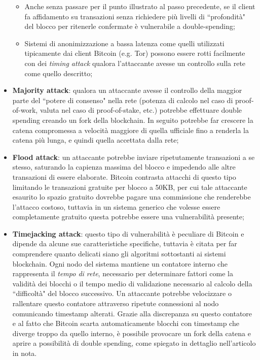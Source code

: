 \begin{itemize}
\begin{itemize}
					\item Anche senza passare per il punto illustrato al passo precedente, se il client fa affidamento su transazioni senza richiedere più livelli di ``profondità" del blocco per ritenerle confermate è vulnerabile a double-spending;
					\item Sistemi di anonimizzazione a bassa latenza come quelli utilizzati tipicamente dai client Bitcoin (e.g. Tor) possono essere rotti facilmente con dei \emph{timing attack} qualora l'attaccante avesse un controllo sulla rete come quello descritto;
				\end{itemize}
				\item \textbf{Majority attack}: qualora un attaccante avesse il controllo della maggior parte del ``potere di consenso" nella rete (potenza di calcolo nel caso di proof-of-work, valuta nel caso di proof-of-stake, etc.) potrebbe effettuare double spending creando un fork della blockchain. In seguito potrebbe far crescere la catena compromessa a velocità maggiore di quella ufficiale fino a renderla la catena più lunga, e quindi quella accettata dalla rete;
				\item \textbf{Flood attack}: un attaccante potrebbe inviare ripetutamente transazioni a se stesso, saturando la capienza massima del blocco e impedendo alle altre transazioni di essere elaborate. Bitcoin contrasta attacchi di questo tipo limitando le transazioni gratuite per blocco a 50KB, per cui tale attaccante esaurito lo spazio gratuito dovrebbe pagare una commissione che renderebbe l'attacco costoso, tuttavia in un sistema generico che volesse essere completamente gratuito questa potrebbe essere una vulnerabilità presente;
				\item \textbf{Timejacking attack}\cite{timejacking}: questo tipo di vulnerabilità è peculiare di Bitcoin e dipende da alcune sue caratteristiche specifiche, tuttavia è citata per far comprendere quanto delicati siano gli algoritmi sottostanti ai sistemi blockchain. Ogni nodo del sistema mantiene un contatore interno che rappresenta il \emph{tempo di rete}, necessario per determinare fattori come la validità dei blocchi o il tempo medio di validazione necessario al calcolo della ``difficoltà" del blocco successivo. Un attaccante potrebbe velocizzare o rallentare questo contatore attraverso ripetute connessioni al nodo comunicando timestamp alterati. Grazie alla discrepanza su questo contatore e al fatto che Bitcoin scarta automaticamente blocchi con timestamp che diverge troppo da quello interno, è possibile provocare un fork della catena e aprire a possibilità di double spending, come spiegato in dettaglio nell'articolo in nota.
			\end{itemize}
